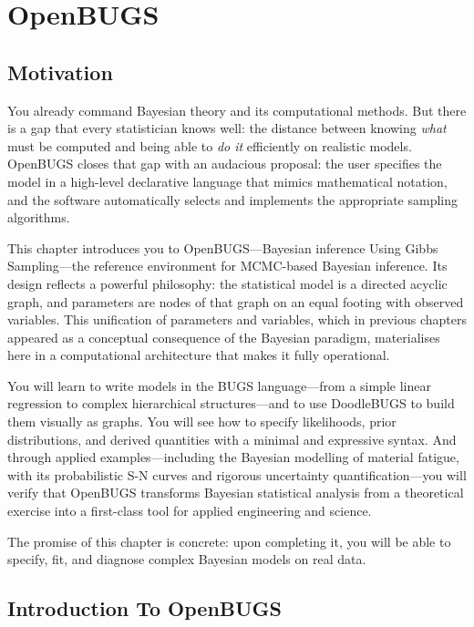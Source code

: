 \startcontents[chapter]
\chapter{OpenBUGS}\label{ch:OpenBUGS}
\minitocboxed

\section*{Motivation}

You already command Bayesian theory and its computational methods. But there is a gap that every
statistician knows well: the distance between knowing \emph{what} must be computed and being able
to \emph{do it} efficiently on realistic models. OpenBUGS closes that gap with an audacious
proposal: the user specifies the model in a high-level declarative language that mimics mathematical
notation, and the software automatically selects and implements the appropriate sampling algorithms.

This chapter introduces you to OpenBUGS---Bayesian inference Using Gibbs Sampling---the reference
environment for MCMC-based Bayesian inference. Its design reflects a powerful philosophy: the
statistical model is a directed acyclic graph, and parameters are nodes of that graph on an equal
footing with observed variables. This unification of parameters and variables, which in previous
chapters appeared as a conceptual consequence of the Bayesian paradigm, materialises here in a
computational architecture that makes it fully operational.

You will learn to write models in the BUGS language---from a simple linear regression to complex
hierarchical structures---and to use DoodleBUGS to build them visually as graphs. You will see how
to specify likelihoods, prior distributions, and derived quantities with a minimal and expressive
syntax. And through applied examples---including the Bayesian modelling of material fatigue, with
its probabilistic S-N curves and rigorous uncertainty quantification---you will verify that OpenBUGS
transforms Bayesian statistical analysis from a theoretical exercise into a first-class tool for
applied engineering and science.

The promise of this chapter is concrete: upon completing it, you will be able to specify, fit, and
diagnose complex Bayesian models on real data.

\section{Introduction To OpenBUGS}

